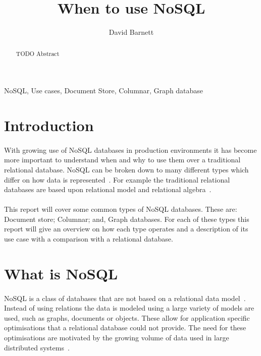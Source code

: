 \documentclass{CRPITStyle}
\renewcommand{\cite}{\citep}
\begin{document}
\title{When to use NoSQL}
\author{David Barnett}

\maketitle

\begin{abstract}
    TODO Abstract
\end{abstract}

\vspace{.1in}

 NoSQL, Use cases, Document Store, Columnar, Graph database

\section{Introduction}

\paragraph{}
With growing use of NoSQL databases in production environments it has become more
important to understand when and why to use them over a traditional
relational database.
NoSQL can be broken down to many different types which differ on how
data is represented~\cite{type_nosql}.
For example the traditional relational databases are based upon relational
model and relational algebra~\cite{relational_db}.

\paragraph{}
This report will cover some common types of NoSQL databases.
These are: Document store; Columnar; and, Graph databases.
For each of these types this report will give an overview on how each type
operates and a description of its use case with a comparison with a
 relational database.

\section{What is NoSQL}

\paragraph{}
NoSQL is a class of databases that are not based on
a relational data model~\cite{nosql_db,nosql_survey}.
Instead of using relations the data is modeled using a large
variety of models are used, such as graphs, documents or objects.
These allow for application specific optimisations that
a relational database could not provide.
The need for these optimisations are motivated by the growing
volume of data used in large distributed systems~\cite{nosql_db,nosql_survey}.
\end{document}
